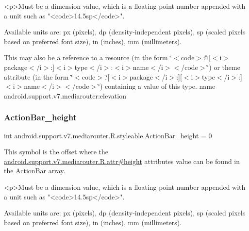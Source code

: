 \begin{DoxyVerb}      <p>Must be a dimension value, which is a floating point number appended with a unit such as "<code>14.5sp</code>".
\end{DoxyVerb}
 Available units are\+: px (pixels), dp (density-\/independent pixels), sp (scaled pixels based on preferred font size), in (inches), mm (millimeters). 

This may also be a reference to a resource (in the form \char`\"{}$<$code$>$@\mbox{[}$<$i$>$package$<$/i$>$\+:\mbox{]}$<$i$>$type$<$/i$>$\+:$<$i$>$name$<$/i$>$$<$/code$>$\char`\"{}) or theme attribute (in the form \char`\"{}$<$code$>$?\mbox{[}$<$i$>$package$<$/i$>$\+:\mbox{]}\mbox{[}$<$i$>$type$<$/i$>$\+:\mbox{]}$<$i$>$name$<$/i$>$$<$/code$>$\char`\"{}) containing a value of this type.  name android.\+support.\+v7.\+mediarouter\+:elevation \mbox{\label{classandroid_1_1support_1_1v7_1_1mediarouter_1_1R_1_1styleable_a0262117be883a00962241b45aaafbce2}} 
\subsubsection{\texorpdfstring{Action\+Bar\+\_\+height}{ActionBar\_height}}
{\footnotesize\ttfamily int android.\+support.\+v7.\+mediarouter.\+R.\+styleable.\+Action\+Bar\+\_\+height = 0\hspace{0.3cm}{\ttfamily [static]}}

This symbol is the offset where the \hyperlink{classandroid_1_1support_1_1v7_1_1mediarouter_1_1R_1_1attr_ac2d0839f9c7aaf7042df6d5beda43613}{android.\+support.\+v7.\+mediarouter.\+R.\+attr\#height} attribute\textquotesingle{}s value can be found in the \hyperlink{classandroid_1_1support_1_1v7_1_1mediarouter_1_1R_1_1styleable_adc4d3c0d096085367f12d025007aa53f}{Action\+Bar} array.

\begin{DoxyVerb}      <p>Must be a dimension value, which is a floating point number appended with a unit such as "<code>14.5sp</code>".
\end{DoxyVerb}
 Available units are\+: px (pixels), dp (density-\/independent pixels), sp (scaled pixels based on preferred font size), in (inches), mm (millimeters). 

